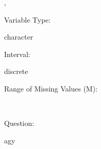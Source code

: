 \documentclass[
]{article}
\begin{document}
,

\begin{minipage}[t]{0.3\linewidth}

\colorbox{mypink1}{}

\end{minipage}%
\begin{minipage}[t]{0.7\linewidth}

\colorbox{mypink1}{}

\end{minipage}

\begin{minipage}[t]{0.3\linewidth}

Variable Type:

\end{minipage}%
\begin{minipage}[t]{0.7\linewidth}

character

\end{minipage}

\begin{minipage}[t]{0.3\linewidth}

Interval:

\end{minipage}%
\begin{minipage}[t]{0.7\linewidth}

discrete

\end{minipage}

\begin{minipage}[t]{0.3\linewidth}

Range of Missing Values (M):

\end{minipage}%
\begin{minipage}[t]{0.7\linewidth}

~

\end{minipage}

\begin{minipage}[t]{0.3\linewidth}

Question:

\end{minipage}%
\begin{minipage}[t]{0.7\linewidth}

agy

\end{minipage}
\end{document}
